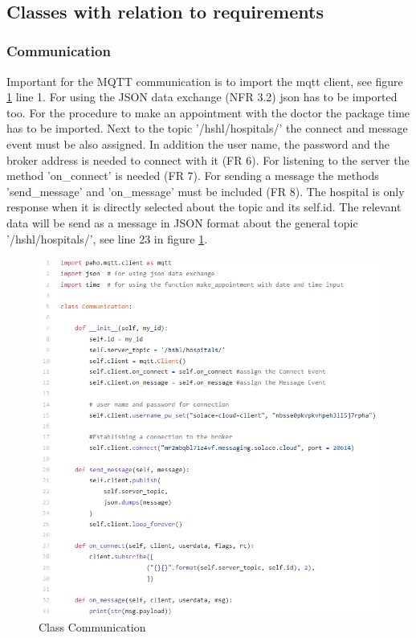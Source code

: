 \\
\subsection{Classes with relation to requirements}
\subsubsection{Communication}
Important for the MQTT communication is to import the mqtt client, see figure \ref{Communication} line 1. For using the JSON data exchange (NFR 3.2) json has to be imported too. For the procedure to make an appointment with the doctor the package time has to be imported. Next to the topic '/hshl/hospitals/' the connect and message event must be also assigned. In addition the user name, the password and the broker address is needed to connect with it (FR 6). For listening to the server the method 'on_connect' is needed (FR 7). For sending a message the methods 'send_message' and 'on_message' must be included (FR 8). The hospital is only response when it is directly selected about the topic and its self.id. The relevant data will be send as a message in JSON format about the general topic '/hshl/hospitals/', see line 23 in figure \ref{Communication}.

\begin{figure}
\centering
\sidecaption
\includegraphics[scale=.53]{images/melanie_images/Communication.png}
\caption{Class Communication}
\label{Communication}
\end{figure}

